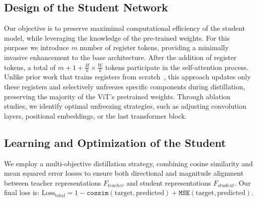 \vspace{-.2cm}
\subsection{Design of the Student Network}
\label{student_method}
\vspace{-.2cm}
Our objective is to preserve maximimal computational efficiency of the student model, while leveraging the knowledge of the pre-trained weights. For this purpose we introduce $m$ number of register tokens, providing a minimally invasive enhancement to the base architecture. After the addition of register tokens, a total of $m + 1 + \frac{H}{k} \times \frac{W}{k}$ tokens participate in the self-attention process. Unlike prior work that trains registers from scratch~\citep{darcet2023vision}, this approach updates only these registers and selectively unfreezes specific components during distillation, preserving the majority of the ViT’s pretrained weights. Through ablation studies, we identify optimal unfreezing strategies, such as adjusting convolution layers, positional embeddings, or the last transformer block. 
\vspace{-.2cm}
\subsection{Learning and Optimization of the Student}
\label{learning_method}
\vspace{-.2cm}
We employ a multi-objective distillation strategy, combining cosine similarity and mean squared error losses to ensure both directional and magnitude alignment between teacher representations $F_{teacher}$ and student representations $F_{student}$. Our final loss is: $\text{Loss}_{\text{total}} = \text{1} -\texttt{cossim}(\text{target}, \text{predicted}) + \texttt{MSE}(\text{target}, \text{predicted})$.
